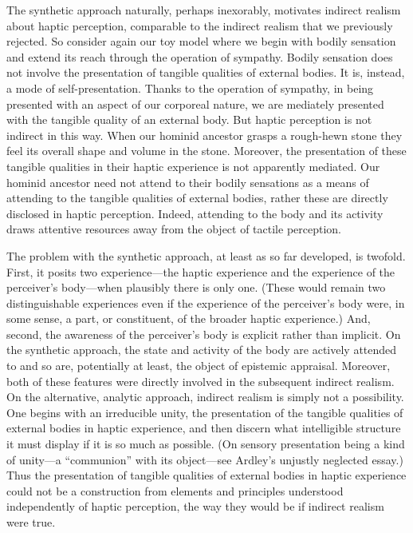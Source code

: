 The synthetic approach naturally, perhaps inexorably, motivates indirect realism about haptic perception, comparable to the indirect realism that we previously rejected. So consider again our toy model where we begin with bodily sensation and extend its reach through the operation of sympathy. Bodily sensation does not involve the presentation of tangible qualities of external bodies. It is, instead, a mode of self-presentation. Thanks to the operation of sympathy, in being presented with an aspect of our corporeal nature, we are mediately presented with the tangible quality of an external body. But haptic perception is not indirect in this way. When our hominid ancestor grasps a rough-hewn stone they feel its overall shape and volume in the stone. Moreover, the presentation of these tangible qualities in their haptic experience is not apparently mediated. Our hominid ancestor need not attend to their bodily sensations as a means of attending to the tangible qualities of external bodies, rather these are directly disclosed in haptic perception. Indeed, attending to the body and its activity draws attentive resources away from the object of tactile perception. 



The problem with the synthetic approach, at least as so far developed, is twofold. First, it posits two experience---the haptic experience and the experience of the perceiver's body---when plausibly there is only one. (These would remain two distinguishable experiences even if the experience of the perceiver's body were, in some sense, a part, or constituent, of the broader haptic experience.) And, second, the awareness of the perceiver's body is explicit rather than implicit. On the synthetic approach, the state and activity of the body are actively attended to and so are, potentially at least, the object of epistemic appraisal. Moreover, both of these features were directly involved in the subsequent indirect realism. On the alternative, analytic approach, indirect realism is simply not a possibility. One begins with an irreducible unity, the presentation of the tangible qualities of external bodies in haptic experience, and then discern what intelligible structure it must display if it is so much as possible. (On sensory presentation being a kind of unity---a ``communion'' with its object---see Ardley's \citeyear{Ardley:1958aa} unjustly neglected essay.) Thus the presentation of tangible qualities of external bodies in haptic experience could not be a construction from elements and principles understood independently of haptic perception, the way they would be if indirect realism were true.

